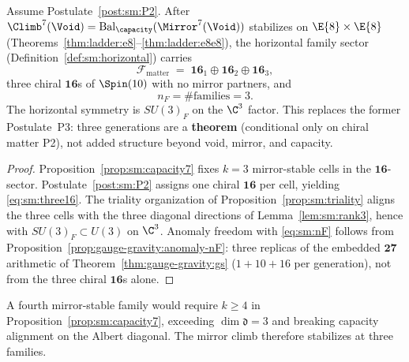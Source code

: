 \begin{theorem}\label{thm:sm:three-families}
Assume Postulate~\ref{post:sm:P2}. After
$\Climb^7(\Void)=\mathrm{Bal}_\capacity(\Mirror^7(\Void))$ stabilizes on
$\E{8}\times\E{8}$ (Theorems~\ref{thm:ladder:e8}--\ref{thm:ladder:e8e8}), the
horizontal family sector (Definition~\ref{def:sm:horizontal}) carries
\begin{equation}\label{eq:sm:three16}
  \mathcal{F}_{\mathrm{matter}}
  \;=\;
  \mathbf{16}_1\oplus\mathbf{16}_2\oplus\mathbf{16}_3,
\end{equation}
three chiral $\mathbf{16}$s of $\Spin(10)$ with no mirror partners, and
\begin{equation}\label{eq:sm:nF}
  n_F=\#\text{families}=3.
\end{equation}
The horizontal symmetry is $SU(3)_F$ on the $\C^3$ factor. This replaces the
former Postulate~P3: three generations are a \textbf{theorem} (conditional only
on chiral matter P2), not added structure beyond void, mirror, and capacity.
\end{theorem}

\begin{proof}
Proposition~\ref{prop:sm:capacity7} fixes $k=3$ mirror-stable cells in the
$\mathbf{16}$-sector. Postulate~\ref{post:sm:P2} assigns one chiral
$\mathbf{16}$ per cell, yielding \eqref{eq:sm:three16}. The triality
organization of Proposition~\ref{prop:sm:triality} aligns the three cells with
the three diagonal directions of Lemma~\ref{lem:sm:rank3}, hence with
$SU(3)_F\subset U(3)$ on $\C^3$. Anomaly freedom with \eqref{eq:sm:nF} follows from
Proposition~\ref{prop:gauge-gravity:anomaly-nF}: three replicas of the
embedded $\mathbf{27}$ arithmetic of Theorem~\ref{thm:gauge-gravity:gs}
($1+10+16$ per generation), not from the three chiral $\mathbf{16}$s alone.
\end{proof}

\begin{corollary}\label{cor:sm:no4th}
A fourth mirror-stable family would require $k\geq4$ in
Proposition~\ref{prop:sm:capacity7}, exceeding $\dim\mathfrak{d}=3$ and
breaking capacity alignment on the Albert diagonal. The mirror climb
therefore stabilizes at three families.
\end{corollary}

